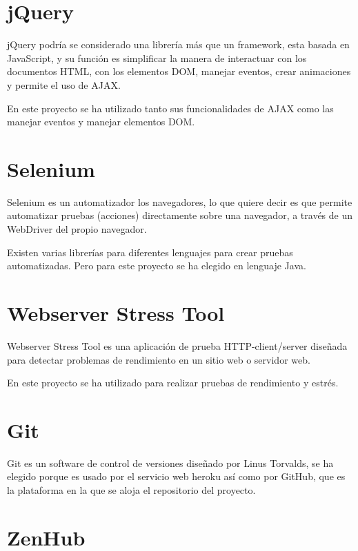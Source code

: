 \section{jQuery}\label{jquery}

jQuery podría se considerado una librería más que un framework, esta basada en JavaScript, y su función es simplificar la manera de interactuar con los documentos HTML, con los elementos DOM, manejar eventos, crear animaciones y permite el uso de AJAX.

En este proyecto se ha utilizado tanto sus funcionalidades de AJAX como las manejar eventos y manejar elementos DOM.

\section{Selenium}\label{selenium}

Selenium es un automatizador los navegadores, lo que quiere decir es que permite automatizar pruebas (acciones) directamente sobre una navegador, a través de un WebDriver del propio navegador.

Existen varias librerías para diferentes lenguajes para crear pruebas automatizadas. Pero para este proyecto se ha elegido en lenguaje Java.

\section{Webserver Stress Tool}\label{WebserverStressTool} 

Webserver Stress Tool es una aplicación de prueba HTTP-client/server diseñada para detectar problemas de rendimiento en un sitio web o servidor web.

En este proyecto se ha utilizado para realizar pruebas de rendimiento y estrés.

\section{Git}\label{Git}

Git es un software de control de versiones diseñado por Linus Torvalds, se ha elegido porque es usado por el servicio web heroku así como por GitHub, que es la plataforma en la que se aloja el repositorio del proyecto.

\section{ZenHub}\label{zenhub}

